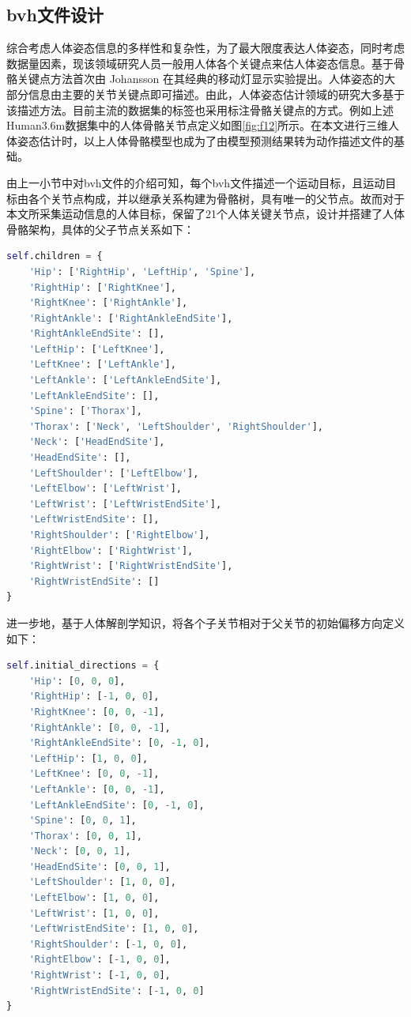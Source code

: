 \subsection{bvh文件设计}{}
综合考虑人体姿态信息的多样性和复杂性，为了最大限度表达人体姿态，同时考虑数据量因素，现该领域研究人员一般用人体各个关键点来估人体姿态信息。基于骨骼关键点方法首次由  Johansson 在其经典的移动灯显示实验提出。人体姿态的大部分信息由主要的关节关键点即可描述。由此，人体姿态估计领域的研究大多基于该描述方法。目前主流的数据集的标签也采用标注骨骼关键点的方式。例如上述Human3.6m数据集中的人体骨骼关节点定义如图\ref{fig:f12}所示。在本文进行三维人体姿态估计时，以上人体骨骼模型也成为了由模型预测结果转为动作描述文件的基础。

由上一小节中对bvh文件的介绍可知，每个bvh文件描述一个运动目标，且运动目标由各个关节点构成，并以继承关系构建为骨骼树，具有唯一的父节点。故而对于本文所采集运动信息的人体目标，保留了21个人体关键关节点，设计并搭建了人体骨骼架构，具体的父子节点关系如下：

\begin{lstlisting}[language=python, label={lst:children}]
 self.children = {
    'Hip': ['RightHip', 'LeftHip', 'Spine'],
    'RightHip': ['RightKnee'],
    'RightKnee': ['RightAnkle'],
    'RightAnkle': ['RightAnkleEndSite'],
    'RightAnkleEndSite': [],
    'LeftHip': ['LeftKnee'],
    'LeftKnee': ['LeftAnkle'],
    'LeftAnkle': ['LeftAnkleEndSite'],
    'LeftAnkleEndSite': [],
    'Spine': ['Thorax'],
    'Thorax': ['Neck', 'LeftShoulder', 'RightShoulder'],
    'Neck': ['HeadEndSite'],
    'HeadEndSite': [],
    'LeftShoulder': ['LeftElbow'],
    'LeftElbow': ['LeftWrist'],
    'LeftWrist': ['LeftWristEndSite'],
    'LeftWristEndSite': [],
    'RightShoulder': ['RightElbow'],
    'RightElbow': ['RightWrist'],
    'RightWrist': ['RightWristEndSite'],
    'RightWristEndSite': []
}
\end{lstlisting}

进一步地，基于人体解剖学知识，将各个子关节相对于父关节的初始偏移方向定义如下：

\begin{lstlisting}[language=python, label={lst:direction}]
self.initial_directions = {
    'Hip': [0, 0, 0],
    'RightHip': [-1, 0, 0],
    'RightKnee': [0, 0, -1],
    'RightAnkle': [0, 0, -1],
    'RightAnkleEndSite': [0, -1, 0],
    'LeftHip': [1, 0, 0],
    'LeftKnee': [0, 0, -1],
    'LeftAnkle': [0, 0, -1],
    'LeftAnkleEndSite': [0, -1, 0],
    'Spine': [0, 0, 1],
    'Thorax': [0, 0, 1],
    'Neck': [0, 0, 1],
    'HeadEndSite': [0, 0, 1],
    'LeftShoulder': [1, 0, 0],
    'LeftElbow': [1, 0, 0],
    'LeftWrist': [1, 0, 0],
    'LeftWristEndSite': [1, 0, 0],
    'RightShoulder': [-1, 0, 0],
    'RightElbow': [-1, 0, 0],
    'RightWrist': [-1, 0, 0],
    'RightWristEndSite': [-1, 0, 0]
}
\end{lstlisting}

